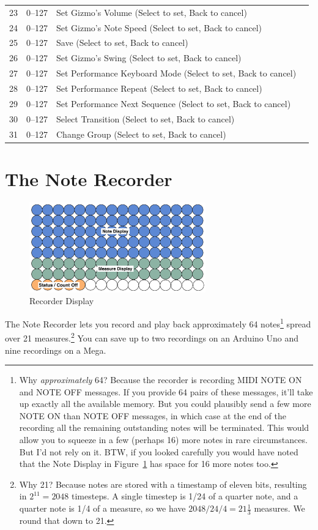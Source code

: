 \documentclass{article}
\begin{document}
{\begin{tabular}{@{}rll@{}l@{}}
23	&	0--127		& Set Gizmo's Volume (Select to set, Back to cancel)\\
24	&	0--127		& Set Gizmo's Note Speed (Select to set, Back to cancel)\\
25	&	0--127		& Save (Select to set, Back to cancel)\\
26	&	0--127		& Set Gizmo's Swing (Select to set, Back to cancel)\\
27	&	0--127		& Set Performance Keyboard Mode (Select to set, Back to cancel)\\
28	&	0--127		& Set Performance Repeat (Select to set, Back to cancel)\\
29	&	0--127		& Set Performance Next Sequence (Select to set, Back to cancel)\\
30	&	0--127		& Select Transition (Select to set, Back to cancel)\\
31	&	0--127		& Change Group (Select to set, Back to cancel)\\
\end{tabular}
}

\clearpage

\section {The Note Recorder}

\begin{figure}
\vspace{-1.5em}\includegraphics[width=3in]{recorder.pdf}
\vspace{-2em}\caption{\small Recorder Display}\vspace{-1em}
\label{recorder}
\end{figure}

The Note Recorder lets you record and play back approximately 64 notes\footnote{Why {\it approximately} 64? Because the recorder is recording MIDI NOTE ON and NOTE OFF messages.  If you provide 64 pairs of these messages, it'll take up exactly all the available memory.  But you could plausibly send a few more NOTE ON than NOTE OFF messages, in which case at the end of the recording all the remaining outstanding notes will be terminated.  This would allow you to squeeze in a few (perhaps 16) more notes in rare circumstances.  But I'd not rely on it.  BTW, if you looked carefully you would have noted that the Note Display in Figure~\ref{recorder} has space for 16 more notes too.} spread over 21 measures.\footnote{Why 21?  Because notes are stored with a timestamp of eleven bits, resulting in \(2^{11} = 2048\) timesteps.  A single timestep is 1/24 of a quarter note, and a quarter note is 1/4 of a measure, so we have \(2048 / 24 / 4 = 21 \frac{1}{3}\) measures.  We round that down to 21.}  You can save up to two recordings on an Arduino Uno and nine recordings on a Mega.
\end{document}
